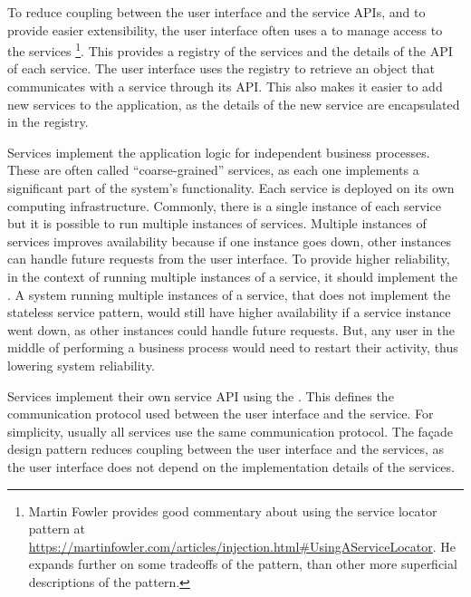 To reduce coupling between the user interface and the service APIs, and to provide easier extensibility, the user interface often uses a
 to manage access to the services%
\footnote{Martin Fowler provides good commentary about using the service locator pattern at \url{https://martinfowler.com/articles/injection.html\#UsingAServiceLocator}.
He expands further on some tradeoffs of the pattern, than other more superficial descriptions of the pattern.}.
This provides a registry of the services and the details of the API of each service.
The user interface uses the registry to retrieve an object that communicates with a service through its API.
This also makes it easier to add new services to the application, as the details of the new service are encapsulated in the registry.

Services implement the application logic for independent business processes.
These are often called ``coarse-grained'' services, as each one implements a significant part of the system's functionality.
Each service is deployed on its own computing infrastructure.
Commonly, there is a single instance of each service but it is possible to run multiple instances of services.
Multiple instances of services improves availability because if one instance goes down, other instances can handle future requests from the user interface.
To provide higher reliability, in the context of running multiple instances of a service, it should implement the
.
A system running multiple instances of a service, that does not implement the stateless service pattern,
would still have higher availability if a service instance went down, as other instances could handle future requests.
But, any user in the middle of performing a business process would need to restart their activity, thus lowering system reliability.

Services implement their own service API using the .
This defines the communication protocol used between the user interface and the service.
For simplicity, usually all services use the same communication protocol.
The façade design pattern reduces coupling between the user interface and the services,
as the user interface does not depend on the implementation details of the services.

